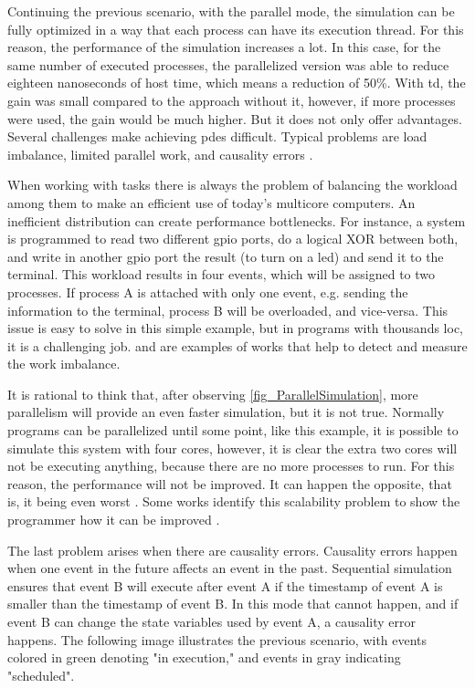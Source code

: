 Continuing the previous scenario, with the parallel mode, the simulation can be fully optimized in a way that each process can have its execution thread. For this reason, the performance of the simulation increases a lot. In this case, for the same number of executed processes, the parallelized version was able to reduce eighteen nanoseconds of host time, which means a reduction of 50\%. With \gls{td}, the gain was small compared to the approach without it, however, if more processes were used, the gain would be much higher. But it does not only offer advantages. Several challenges make achieving \gls{pdes} difficult. Typical problems are load imbalance, limited parallel work, and causality errors \cite{yoga2019parallelism} \cite{zhou1992sequential}. 

When working with tasks there is always the problem of balancing the workload among them to make an efficient use of today's multicore computers. An inefficient distribution can create performance bottlenecks. For instance, a system is programmed to read two different \gls{gpio} ports, do a logical XOR between both, and write in another \gls{gpio} port the result (to turn on a \gls{led}) and send it to the terminal. This workload results in four events, which will be assigned to two processes. If process A is attached with only one event, e.g. sending the information to the terminal, process B will be overloaded, and vice-versa. This issue is easy to solve in this simple example, but in programs with thousands \gls{loc}, it is a challenging job. \cite{loadImbalance1} and \cite{loadImbalance2} are examples of works that help to detect and measure the work imbalance.

It is rational to think that, after observing \autoref{fig_ParallelSimulation}, more parallelism will provide an even faster simulation, but it is not true. Normally programs can be parallelized until some point, like this example, it is possible to simulate this system with four cores, however, it is clear the extra two cores will not be executing anything, because there are no more processes to run. For this reason, the performance will not be improved. It can happen the opposite, that is, it being even worst \cite{scabilityIssue}. Some works identify this scalability problem to show the programmer how it can be improved \cite{scalabilityProblem} \cite{scalabilityProblem2}.

The last problem arises when there are causality errors. Causality errors happen when one event in the future affects an event in the past. Sequential simulation ensures that event B will execute after event A if the timestamp of event A is smaller than the timestamp of event B. In this mode that cannot happen, and if event B can change the state variables used by event A, a causality error happens. The following image illustrates the previous scenario, with events colored in green denoting "in execution," and events in gray indicating "scheduled".

